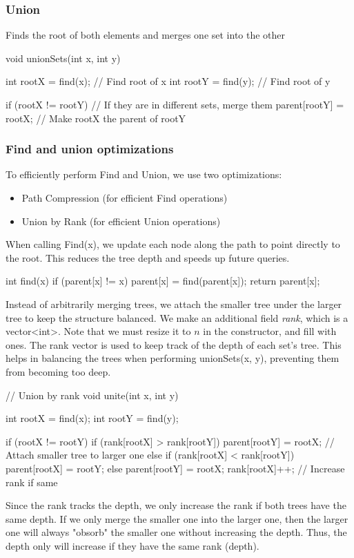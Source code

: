 \documentclass{report}
\begin{document}
\bigbreak \noindent 
\subsubsection{Union}
\bigbreak \noindent 
Finds the root of both elements and merges one set into the other
\bigbreak \noindent 
\begin{cppcode}
    void unionSets(int x, int y) {
        int rootX = find(x);  // Find root of x
        int rootY = find(y);  // Find root of y

        if (rootX != rootY)   // If they are in different sets, merge them
            parent[rootY] = rootX;  // Make rootX the parent of rootY
    }
\end{cppcode}

\bigbreak \noindent 
\subsubsection{Find and union optimizations}
\bigbreak \noindent 
To efficiently perform Find and Union, we use two optimizations:
\begin{itemize}
    \item Path Compression (for efficient Find operations)
    \item Union by Rank (for efficient Union operations)
\end{itemize}
\bigbreak \noindent 
When calling Find(x), we update each node along the path to point directly to the root. This reduces the tree depth and speeds up future queries.
\bigbreak \noindent 
\begin{cppcode}
    int find(x) {
        if (parent[x] != x) {
            parent[x] = find(parent[x]);
        } 
        return parent[x];
    }
\end{cppcode}
\bigbreak \noindent 
Instead of arbitrarily merging trees, we attach the smaller tree under the larger tree to keep the structure balanced. We make an additional field \textit{rank}, which is a vector<int>. Note that we must resize it to $n$ in the constructor, and fill with ones.
\bigbreak \noindent 
The rank vector is used to keep track of the depth of each set's tree. This helps in balancing the trees when performing unionSets(x, y), preventing them from becoming too deep.
\bigbreak \noindent 
\begin{cppcode}
    // Union by rank
    void unite(int x, int y) {
        int rootX = find(x);
        int rootY = find(y);

        if (rootX != rootY) {
            if (rank[rootX] > rank[rootY]) {
                parent[rootY] = rootX; // Attach smaller tree to larger one
            } else if (rank[rootX] < rank[rootY]) {
                parent[rootX] = rootY;
            } else {
                parent[rootY] = rootX;
                rank[rootX]++; // Increase rank if same
            }
        }
    }
\end{cppcode}
\bigbreak \noindent 
Since the rank tracks the depth, we only increase the rank if both trees have the same depth. If we only merge the smaller one into the larger one, then the larger one will always "obsorb" the smaller one without increasing the depth. Thus, the depth only will increase if they have the same rank (depth).
\end{document}
